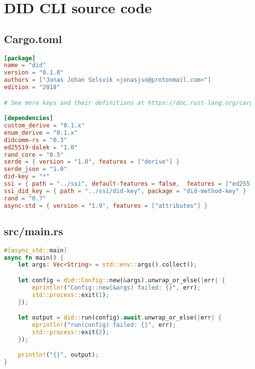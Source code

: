 \chapter{DID CLI source code}


\section{Cargo.toml}
\begin{lstlisting}[language=toml]
[package]
name = "did"
version = "0.1.0"
authors = ["Jonas Johan Solsvik <jonasjso@protonmail.com>"]
edition = "2018"

# See more keys and their definitions at https://doc.rust-lang.org/cargo/reference/manifest.html

[dependencies]
custom_derive = "0.1.x"
enum_derive = "0.1.x"
didcomm-rs = "0.3"
ed25519-dalek = "1.0"
rand_core = "0.5"
serde = { version = "1.0", features = ["derive"] }
serde_json = "1.0"
did-key = "*"
ssi = { path = "../ssi", default-features = false,  features = ["ed25519-dalek", "rand", "sha2"]  }
ssi_did_key = { path = "../ssi/did-key", package = "did-method-key" }
rand = "0.7"
async-std = { version = "1.9", features = ["attributes"] }

\end{lstlisting}



\pagebreak


\section{src/main.rs}
\begin{lstlisting}[language=Rust]
#[async_std::main]
async fn main() {
    let args: Vec<String> = std::env::args().collect();

    let config = did::Config::new(&args).unwrap_or_else(|err| {
        eprintln!("Config::new(&args) failed: {}", err);
        std::process::exit(1);
    });

    let output = did::run(config).await.unwrap_or_else(|err| {
        eprintln!("run(config) failed: {}", err);
        std::process::exit(2);
    });

    println!("{}", output);
}
\end{lstlisting}





